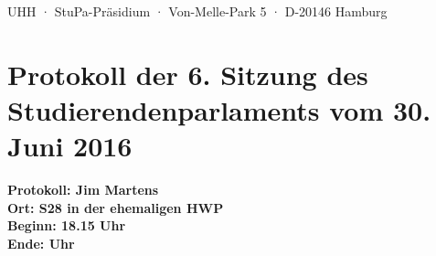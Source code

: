 \documentclass[ngerman,headheight=70pt]{scrartcl}
\begin{document}
    UHH · StuPa-Präsidium · Von-Melle-Park 5 · D-20146 Hamburg

    \section*{Protokoll der 6. Sitzung des Studierendenparlaments vom 30. Juni 2016}

    \textbf{Protokoll: Jim Martens}\\
    \textbf{Ort: S28 in der ehemaligen HWP}\\
    \textbf{Beginn: 18.15 Uhr}\\
    \textbf{Ende: Uhr}

    \vspace{0.5cm}
\end{document}
